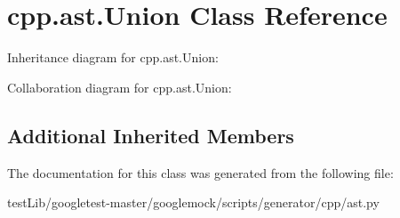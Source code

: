 \hypertarget{classcpp_1_1ast_1_1Union}{}\section{cpp.\+ast.\+Union Class Reference}
\label{classcpp_1_1ast_1_1Union}


Inheritance diagram for cpp.\+ast.\+Union\+:


Collaboration diagram for cpp.\+ast.\+Union\+:
\subsection*{Additional Inherited Members}


The documentation for this class was generated from the following file\+:\begin{DoxyCompactItemize}
\item 
test\+Lib/googletest-\/master/googlemock/scripts/generator/cpp/ast.\+py\end{DoxyCompactItemize}
